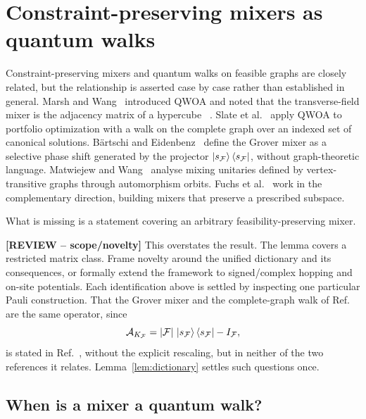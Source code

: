 \section{\label{sec:mixers-as-walks}Constraint-preserving mixers as
quantum walks}

Constraint-preserving mixers and quantum walks on feasible graphs are closely related, but the relationship is asserted case by case rather than established in general. Marsh and Wang~\cite{Marsh2020} introduced QWOA and noted that the transverse-field mixer is the adjacency matrix of a hypercube ~\cite{Marsh2019}. Slate et al.~\cite{Slate2021} apply QWOA to portfolio optimization with a walk on the complete graph over an indexed set of canonical solutions. Bärtschi and Eidenbenz~\cite{Bartschi2020} define the Grover mixer as a selective phase shift generated by the projector $\ket{s_{\mathcal{F}}}\bra{s_{\mathcal{F}}}$, without graph-theoretic language. Matwiejew and Wang~\cite{Matwiejew2024} analyse mixing unitaries defined by vertex-transitive graphs through automorphism orbits. Fuchs et al.~\cite{Fuchs2022,Fuchs2024} work in the complementary direction, building mixers that preserve a prescribed subspace.

What is missing is a statement covering an arbitrary feasibility-preserving mixer.

{\color{red}\textbf{[REVIEW -- scope/novelty]} This overstates the result. The lemma covers a restricted matrix class. Frame novelty around the unified dictionary and its consequences, or formally extend the framework to signed/complex hopping and on-site potentials.} Each identification above is settled by inspecting one particular Pauli construction. That the Grover mixer and the complete-graph walk of Ref.~\cite{Slate2021} are the same operator, since
\begin{equation}
\mathcal{A}_{K_{\mathcal{F}}} = |\mathcal{F}|\,\ket{s_{\mathcal{F}}}\bra{s_{\mathcal{F}}} - I_{\mathcal{F}} ,
    \label{eq:grover-complete}
\end{equation}
is stated in Ref.~\cite{Bridi2024}, without the explicit rescaling, but in neither of the two references it relates. Lemma~\ref{lem:dictionary} settles such questions once.

\subsection{\label{subsec:dictionary}When is a mixer a quantum walk?}

